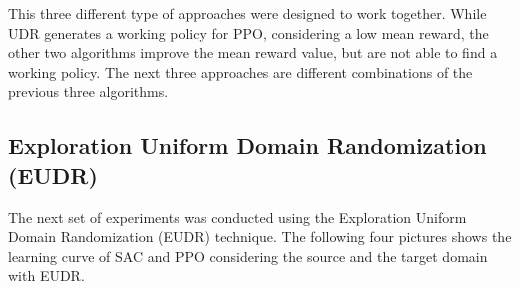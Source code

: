 \documentclass[12pt]{article}
\begin{document}
This three different type of approaches were designed to work together. While UDR generates a working policy for PPO, considering a low mean reward, the other two algorithms improve the mean reward value, but are not able to find a working policy. The next three approaches are different combinations of the previous three algorithms.

\subsection{Exploration Uniform Domain Randomization (EUDR)}

The next set of experiments was conducted using the Exploration Uniform Domain Randomization (EUDR) technique. The following four pictures shows the learning curve of SAC and PPO considering the source and the target domain with EUDR.
\end{document}
